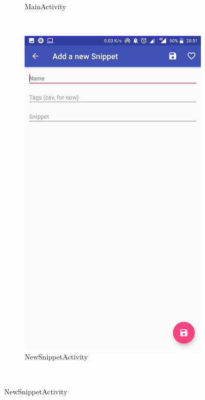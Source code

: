 \documentclass[11pt]{article}
\begin{document}
\begin{figure}
\begin{subfigure}[b]{0.3\textwidth}
					\caption{MainActivity}
				\end{subfigure}
				~ %
				\begin{subfigure}[b]{0.3\textwidth}
					\includegraphics[width=\textwidth]{Konzepte/screenshots/add_snippet.jpg}
					\caption{NewSnippetActivity}
				\end{subfigure}
				~ %

\end{figure}
\end{document}
